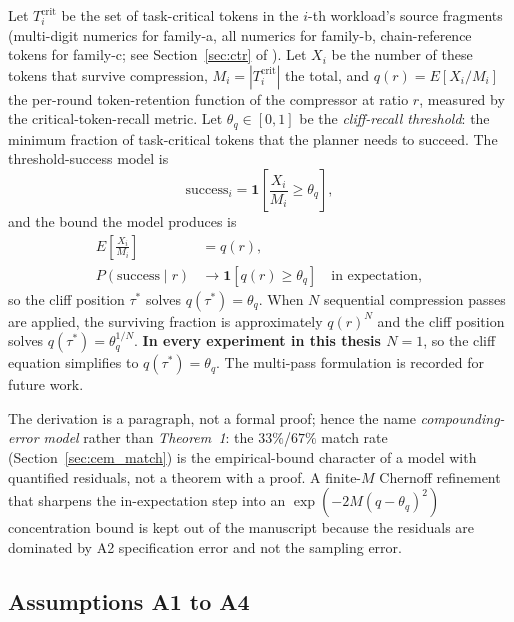 Let $T^\text{crit}_i$ be the set of task-critical tokens in the
$i$-th workload's source fragments (multi-digit numerics for
family-a, all numerics for family-b, chain-reference tokens for
family-c; see Section~\ref{sec:ctr} of
). Let $X_i$ be the number of these
tokens that survive compression, $M_i = |T^\text{crit}_i|$ the
total, and $q(r) = E[X_i / M_i]$ the per-round token-retention
function of the compressor at ratio $r$, measured by the
critical-token-recall metric. Let $\theta_q \in [0, 1]$ be the
\emph{cliff-recall threshold}: the minimum fraction of
task-critical tokens that the planner needs to succeed. The
threshold-success model is
\[
  \text{success}_i = \mathbf{1}\!\left[\frac{X_i}{M_i} \ge \theta_q\right],
\]
and the bound the model produces is
\begin{align}
  E\!\left[\frac{X_i}{M_i}\right] &= q(r), \\
  P(\text{success}\mid r) &\to \mathbf{1}\!\left[q(r) \ge \theta_q\right]
  \quad \text{in expectation},
  \label{eq:cem_bound}
\end{align}
so the cliff position $\tau^{*}$ solves $q(\tau^{*}) = \theta_q$.
When $N$ sequential compression passes are applied, the surviving
fraction is approximately $q(r)^N$ and the cliff position solves
$q(\tau^{*}) = \theta_q^{1/N}$. \textbf{In every experiment in
this thesis $N=1$}, so the cliff equation simplifies to
$q(\tau^{*}) = \theta_q$. The multi-pass formulation is recorded
for future work.

The derivation is a paragraph, not a formal proof; hence the name
\emph{compounding-error model} rather than \emph{Theorem~1}: the $33\%$/$67\%$ match rate
(Section~\ref{sec:cem_match}) is the empirical-bound character of a
model with quantified residuals, not a theorem with a proof. A
finite-$M$ Chernoff refinement
that sharpens the in-expectation step into an
$\exp(-2M(q-\theta_q)^2)$ concentration bound is kept out of the
manuscript because the residuals are dominated by A2 specification
error and not the sampling error. 

\subsection{Assumptions A1 to A4}
\label{sec:cem_assumptions}

